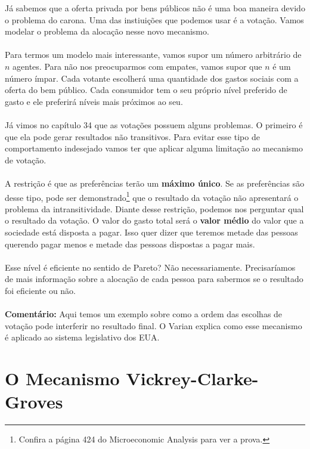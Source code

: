 \documentclass[a4paper,11pt,oneside]{book}
\theoremstyle{definition}
\theoremstyle{break}
\begin{document}
Já sabemos que a oferta privada por bens públicos não é uma boa maneira devido o problema do carona. Uma das instiuições que podemos usar é a votação. Vamos modelar o problema da alocação nesse novo mecanismo.
\\~\\
Para termos um modelo mais interessante, vamos supor um número arbitrário de $n$ agentes. Para não nos preocuparmos com empates, vamos supor que $n$ é um número ímpar. Cada votante escolherá uma quantidade dos gastos sociais com a oferta do bem público. Cada consumidor tem o seu próprio nível preferido de gasto e ele preferirá níveis mais próximos ao seu.
\\~\\
Já vimos no capítulo 34 que as votações possuem alguns problemas. O primeiro é que ela pode gerar resultados não transitivos. Para evitar esse tipo de comportamento indesejado vamos ter que aplicar alguma limitação ao mecanismo de votação.
\\~\\
A restrição é que as preferências terão um \textbf{máximo único}. Se as preferências são desse tipo, pode ser demonstrado\footnote{Confira a página 424 do Microeconomic Analysis para ver a prova.} que o resultado da votação não apresentará o problema da intransitividade. Diante desse restrição, podemos nos perguntar qual o resultado da votação. O valor do gasto total será o \textbf{valor médio} do valor que a sociedade está disposta a pagar. Isso quer dizer que teremos metade das pessoas querendo pagar menos e metade das pessoas dispostas a pagar mais.
\\~\\
Esse nível é eficiente no sentido de Pareto? Não necessariamente. Precisaríamos de mais informação sobre a alocação de cada pessoa para sabermos se o resultado foi eficiente ou não.
\\~\\
\textbf{Comentário:} Aqui temos um exemplo sobre como a ordem das escolhas de votação pode interferir no resultado final. O Varian explica como esse mecanismo é aplicado ao sistema legislativo dos EUA.

\section{O Mecanismo Vickrey-Clarke-Groves}
\end{document}
